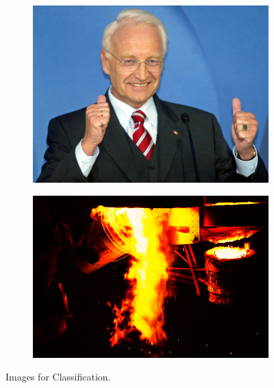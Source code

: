 \documentclass[journal, a4paper]{IEEEtran}
\begin{document}
\begin{figure}[h]
    \begin{subfigure}{.25\textwidth}
      \centering
      \includegraphics[width=.8\linewidth]{../data/IMG_7}
      \caption{}
      \label{fig:g}
    \end{subfigure}%
    \begin{subfigure}{.25\textwidth}
      \centering
      \includegraphics[width=.8\linewidth]{../data/IMG_8}
      \caption{}
      \label{fig:h}
    \end{subfigure}

    \caption{Images for Classification.}
    \label{fig:imgs}
  \end{figure}
\end{document}
